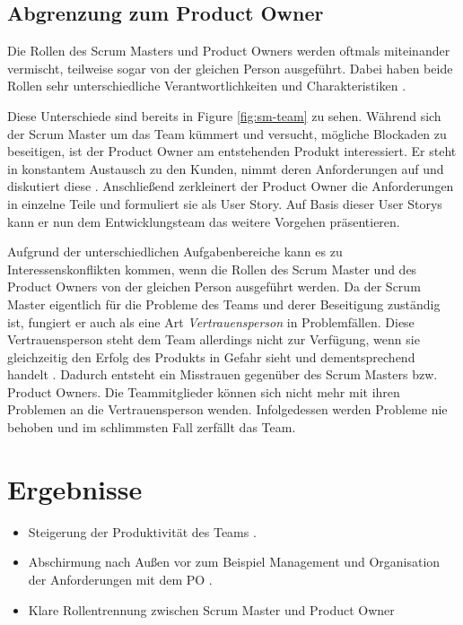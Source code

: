 \documentclass[5pt, final]{beamer}
\begin{document}
\begin{frame}[t]
\begin{multicols}{3}
			\subsection{Abgrenzung zum Product Owner}
			
            Die Rollen des Scrum Masters und Product Owners werden oftmals miteinander vermischt, teilweise sogar von der gleichen Person ausgeführt.
            Dabei haben beide Rollen sehr unterschiedliche Verantwortlichkeiten und Charakteristiken \cite{sutherland14}.
            
            Diese Unterschiede sind bereits in Figure \ref{fig:sm-team} zu sehen.
            Während sich der Scrum Master um das Team kümmert und versucht, mögliche Blockaden zu beseitigen, ist der Product Owner am entstehenden Produkt interessiert.
            Er steht in konstantem Austausch zu den Kunden, nimmt deren Anforderungen auf und diskutiert diese \cite{Spiegler21}.
            Anschließend zerkleinert der Product Owner die Anforderungen in einzelne Teile und formuliert sie als User Story.
            Auf Basis dieser User Storys kann er nun dem Entwicklungsteam das weitere Vorgehen präsentieren.
            
            Aufgrund der unterschiedlichen Aufgabenbereiche kann es zu Interessenskonflikten kommen, wenn die Rollen des Scrum Master und des Product Owners von der gleichen Person ausgeführt werden.
            Da der Scrum Master eigentlich für die Probleme des Teams und derer Beseitigung zuständig ist, fungiert er auch als eine Art \textit{Vertrauensperson} in Problemfällen.
            Diese Vertrauensperson steht dem Team allerdings nicht zur Verfügung, wenn sie gleichzeitig den Erfolg des Produkts in Gefahr sieht und dementsprechend handelt \cite{me-company}.
            Dadurch entsteht ein Misstrauen gegenüber des Scrum Masters bzw. Product Owners.
            Die Teammitglieder können sich nicht mehr mit ihren Problemen an die Vertrauensperson wenden.
            Infolgedessen werden Probleme nie behoben und im schlimmsten Fall zerfällt das Team.
			
			\section{Ergebnisse}
			
            \begin{itemize}
    			\item Steigerung der Produktivität des Teams \cite{vantighem24}.
    			\item Abschirmung nach Außen vor zum Beispiel Management und Organisation der Anforderungen mit dem PO \cite{meindl12}.
                \item Klare Rollentrennung zwischen Scrum Master und Product Owner
            \end{itemize}
			

\end{multicols}
\end{frame}
\end{document}
